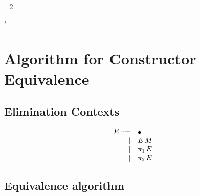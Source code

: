 \documentclass[]{article}
\begin{document}
\infrule
  {\validconstructor{\context}
     {}
     {}\qquad
   }
  {\equivconstructor{\context}
     {
             {\constructor_2}}
     {}
     {}}

\infrule
  {
     {}}
  {\equivconstructor{\context}
     {}
     {\constructor}{\kind}}

\infrule
  {
     {}}
  {\equivconstructor{\context}
     {}
     {\constructor'}{}}

\section{Algorithm for Constructor Equivalence}

\subsection{Elimination Contexts}

\newcommand{\hole}{\bullet}

\[
\begin{array}{rll}
E ::= &\hole\\
    |&\capply{E}{\constructor}\\
    |&\cpi{1}{E}\\
    |&\cpi{2}{E}\\
\end{array}
\]

\subsection{Equivalence algorithm}
\end{document}
